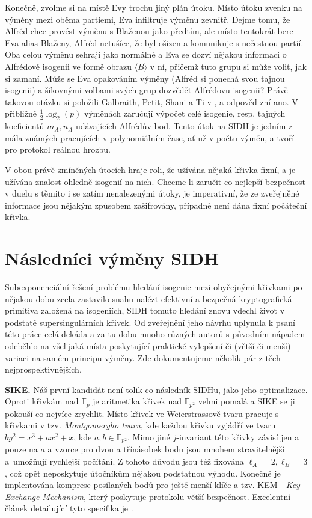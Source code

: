 \documentclass[12pt]{report}
\begin{document}
Konečně, zvolme si na místě Evy trochu jiný plán útoku. Místo útoku zvenku na výměny mezi oběma partiemi, Eva infiltruje výměnu zevnitř. Dejme tomu, že Alfréd chce provést výměnu s Blaženou jako předtím, ale místo tentokrát bere Eva alias Blaženy, Alfréd netušíce, že byl ošizen a komunikuje s nečestnou partií. Oba celou výměnu sehrají jako normálně a Eva se dozví nějakou informaci o Alfrédově isogenii ve formě obrazu $\langle B \rangle$ v ní, přičemž tuto grupu si může volit, jak si zamaní. Může se Eva opakováním výměny (Alfréd si ponechá svou tajnou isogenii) a šikovnými volbami svých grup dozvědět Alfrédovu isogenii? Právě takovou otázku si položili Galbraith, Petit, Shani a Ti v \cite{Galbraith4}, a odpověď zní ano. V přibližně $\frac{1}{2} \log_2 (p)$ výměnách zaručují výpočet celé isogenie, resp. tajných koeficientů $m_A,n_A$ udávajících Alfrédův bod. Tento útok na SIDH  je jedním z mála známých pracujících v polynomiálním čase, ať už v počtu výměn, a tvoří pro protokol reálnou hrozbu.

V obou právě zmíněných útocích hraje roli, že užívána nějaká křivka fixní, a je užívána znalost ohledně isogenií na nich. Chceme-li zaručit co nejlepší bezpečnost v duelu s těmito i se zatím nenalezenými útoky, je imperativní, že ze zveřejněné informace jsou nějakým způsobem zašifrovány, případně není dána fixní počáteční křivka. 



\section{Následníci výměny SIDH}

Subexponenciální řešení problému hledání isogenie mezi obyčejnými křivkami po nějakou dobu zcela zastavilo snahu nalézt efektivní a bezpečná kryptografická primitiva založená na isogeniích, SIDH tomuto hledání znovu vdechl život v podstatě supersingulárních křivek. Od zveřejnění jeho návrhu uplynula k psaní této práce celá dekáda a za tu dobu mnoho různých autorů s původním nápadem odeběhlo na všelijaká místa poskytující praktické vylepšení či (větší či menší) variaci na samém principu výměny. Zde dokumentujeme několik pár z těch nejprospektivnějších.

\textbf{SIKE.} \cite{SIKE} Náš první kandidát není tolik co následník SIDHu, jako jeho optimalizace. Oproti křivkám nad $\mathbb{F}_p$ je aritmetika křivek nad $\mathbb{F}_{p^2}$ velmi pomalá a SIKE se ji pokouší co nejvíce zrychlit. Místo křivek ve Weierstrassově tvaru pracuje s křivkami v tzv. \textit{Montgomeryho tvaru}, kde každou křivku vyjádří ve tvaru $b y^2 = x^3 + ax^2 + x$, kde $a,b \in \mathbb{F}_{p^2}$. Mimo jiné $j$-invariant této křivky závisí jen a pouze na $a$ a vzorce pro dvou a třínásobek bodu jsou mnohem stravitelnější a~umožňují rychlejší počítání. Z tohoto důvodu jsou též fixována $\ell_A = 2, \ell_B = 3$, což opět neposkytuje útočníkům nějakou podstatnou výhodu. Konečně je implentována komprese posílaných bodů pro ještě menší klíče a tzv. KEM - \textit{Key Exchange Mechanism}, který poskytuje protokolu větší bezpečnost. Excelentní článek detailující tyto specifika je \cite{Costello}. 
\end{document}
